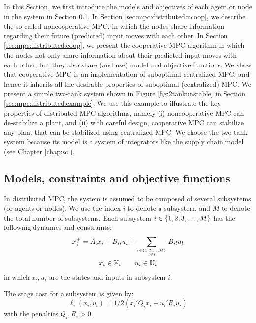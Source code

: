 In this Section, we first introduce the models and objectives of each
agent or node in the system in Section
\ref{sec:mpc:distributed:models}. In Section \ref{sec:mpc:distributed:ncoop}, we describe the
so-called noncooperative MPC, in which the nodes share information
regarding their future (predicted) input moves with each other. In Section
\ref{sec:mpc:distributed:coop}, we present the cooperative MPC
algorithm in which the nodes not only share information about their
predicted input moves with each other, but they also share (and use)
model and objective functions. We show that cooperative MPC is an
implementation of suboptimal centralized MPC, and hence it inherits
all the desirable properties of suboptimal (centralized) MPC. 
We   present a simple  two-tank system shown in Figure
\ref{fig:2tankunstable} in Section
\ref{sec:mpc:distributed:example}. We use this example to illustrate
the key properties of distributed
MPC algorithms, namely (i) noncooperative MPC can de-stabilize a
plant, and (ii) with careful design, cooperative MPC can stabilize any
plant that can be stabilized using centralized MPC. We choose the two-tank system
because its model is a system of integrators like the supply chain
model (see Chapter \ref{chap:sc}).
 
\subsection{Models, constraints and objective functions}
\label{sec:mpc:distributed:models}
In distributed MPC, the system is assumed to be composed of several
subsystems (or agents or nodes). We use the index $i$ to denote a
subsystem, and $M$ to denote the total number of subsystems. Each
subsystem $i \in \left\lbrace 1,2,3,\ldots,M \right\rbrace$ has the following dynamics
and constraints:
\begin{gather}
\label{eq:mpc:distributed:dynamics}
x_i^+ = A_i x_i + B_{ii} u_i + \sum_{l \in \left\lbrace 1,2,\ldots,M \right\rbrace \atop l \neq i}
B_{il} u_l \\
x_i \in \mathbb{X}_i \qquad u_i \in
\mathbb{U}_i \label{eq:mpc:distributed:constraints} 
\end{gather}
in which $x_i,u_i$ are the states and inputs in subsystem $i$.

The stage cost for a subsystem is given by:
\begin{equation}
\label{eq:mpc:distributed:stage-cost}
\ell_i(x_i,u_i) = 1/2(x_i'Q_ix_i + u_i'R_iu_i)
\end{equation}
with the penalties $Q_i,R_i >0$. 

